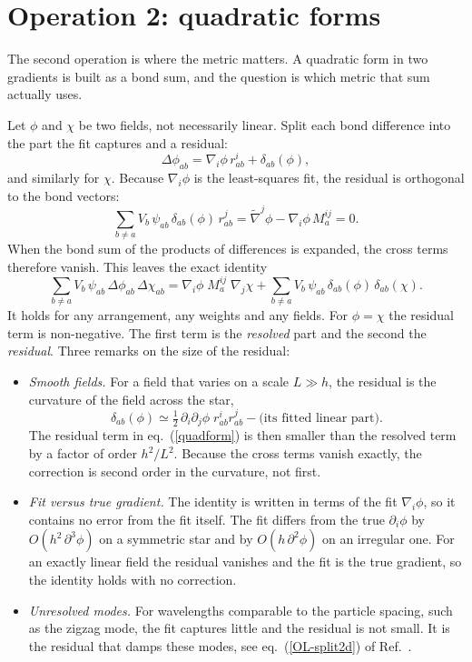 \documentclass[11pt,aps,preprint,nofootinbib,superscriptaddress,tightenlines]{revtex4-2}
\def\st{\begin{equation}}
\def\stp{\end{equation}}
\def\Eq#1{eq.~(\ref{#1})}
\newcommand{\EqOL}[1]{eq.~(\ref{OL-#1}) of Ref.~\cite{OneLevel}}
\begin{document}
\section{Operation 2: quadratic forms}
\label{sec:op2}

The second operation is where the metric matters.  A quadratic form in two
gradients is built as a bond sum, and the question is which metric that sum
actually uses.

Let $\phi$ and $\chi$ be two fields, not necessarily linear.  Split each bond
difference into the part the fit captures and a residual:
\st
\Delta\phi_{ab}=\nabla_i\phi\,r^i_{ab}+\delta_{ab}(\phi),
\label{residual}
\stp
and similarly for $\chi$.  Because $\nabla_i\phi$ is the least-squares fit, the
residual is orthogonal to the bond vectors:
\st
\sum_{b\neq a}V_b\,\psi_{ab}\,\delta_{ab}(\phi)\,r^j_{ab}=\tilde\nabla^j\phi-\nabla_i\phi\,M_a^{ij}=0 .
\label{orthog}
\stp
When the bond sum of the products of differences is expanded, the cross terms
therefore vanish.  This leaves the exact identity
\st
\sum_{b\neq a}V_b\,\psi_{ab}\,\Delta\phi_{ab}\,\Delta\chi_{ab}
=\nabla_i\phi\;M_a^{ij}\;\nabla_j\chi
+\sum_{b\neq a}V_b\,\psi_{ab}\,\delta_{ab}(\phi)\,\delta_{ab}(\chi) .
\label{quadform}
\stp
It holds for any arrangement, any weights and any fields.  For $\phi=\chi$ the
residual term is non-negative.  The first term is the \emph{resolved} part and
the second the \emph{residual}.  Three remarks on the size of the residual:
\begin{itemize}
\item \emph{Smooth fields.}  For a field that varies on a scale $L\gg h$, the
  residual is the curvature of the field across the star,
  \st
  \delta_{ab}(\phi)\simeq\tfrac12\,\partial_i\partial_j\phi\;r^i_{ab}r^j_{ab}
  -\big(\text{its fitted linear part}\big) .
  \stp
  The residual term in \Eq{quadform} is then smaller than the resolved term by
  a factor of order $h^2/L^2$.  Because the cross terms vanish exactly,
  the correction is second order in the curvature, not first.
\item \emph{Fit versus true gradient.}  The identity is written in terms of the
  fit $\nabla_i\phi$, so it contains no error from the fit itself.  The fit
  differs from the true $\partial_i\phi$ by $O(h^2\,\partial^3\phi)$ on a
  symmetric star and by $O(h\,\partial^2\phi)$ on an irregular one.  For an exactly
  linear field the residual vanishes and the fit is the true gradient, so the
  identity holds with no correction.
\item \emph{Unresolved modes.}  For wavelengths comparable to the
  particle spacing, such as the zigzag mode, the fit captures little and the
  residual is not small.  It is the residual that damps these modes, see
  \EqOL{split2d}.
\end{itemize}
\end{document}
